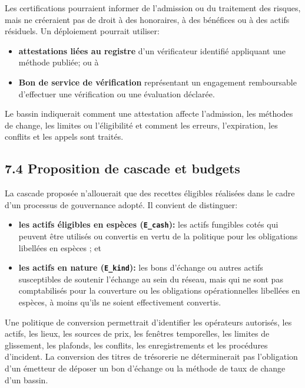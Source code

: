 \documentclass[11pt]{article}
\begin{document}
Les certifications pourraient informer de l'admission ou du traitement des risques, mais ne créeraient pas de droit à des honoraires, à des bénéfices ou à des actifs résiduels. Un déploiement pourrait utiliser:

\begin{itemize}[leftmargin=*]
\item \textbf{attestations liées au registre} d'un vérificateur identifié appliquant une méthode publiée; ou à
\item \textbf{Bon de service de vérification} représentant un engagement remboursable d'effectuer une vérification ou une évaluation déclarée.
\end{itemize}
Le bassin indiquerait comment une attestation affecte l'admission, les méthodes de change, les limites ou l'éligibilité et comment les erreurs, l'expiration, les conflits et les appels sont traités.

\subsection*{7.4 Proposition de cascade et budgets}

La cascade proposée n'allouerait que des recettes éligibles réalisées dans le cadre d'un processus de gouvernance adopté. Il convient de distinguer:

\begin{itemize}[leftmargin=*]
\item \textbf{les actifs éligibles en espèces (\texttt{E\_cash}):} les actifs fungibles cotés qui peuvent être utilisés ou convertis en vertu de la politique pour les obligations libellées en espèces ; et
\item \textbf{les actifs en nature (\texttt{E\_kind}):} les bons d'échange ou autres actifs susceptibles de soutenir l'échange au sein du réseau, mais qui ne sont pas comptabilisés pour la couverture ou les obligations opérationnelles libellées en espèces, à moins qu'ils ne soient effectivement convertis.
\end{itemize}
Une politique de conversion permettrait d'identifier les opérateurs autorisés, les actifs, les lieux, les sources de prix, les fenêtres temporelles, les limites de glissement, les plafonds, les conflits, les enregistrements et les procédures d'incident. La conversion des titres de trésorerie ne déterminerait pas l'obligation d'un émetteur de déposer un bon d'échange ou la méthode de taux de change d'un bassin.
\end{document}
